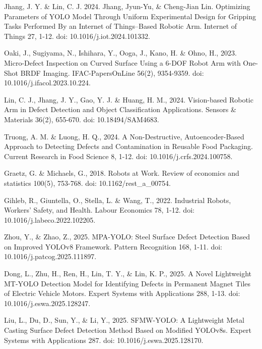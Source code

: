 
\begin{thebibliography}{9}

  Jhang, J. Y. \& Lin, C. J. 2024. Jhang, Jyun-Yu, \& Cheng-Jian
  Lin. Optimizing Parameters of YOLO Model Through Uniform
  Experimental Design for Gripping Tasks Performed By an Internet of
  Things–Based Robotic Arm. Internet of Things 27, 1-12. doi:
  10.1016/j.iot.2024.101332.

  Oaki, J., Sugiyama, N., Ishihara, Y., Ooga, J., Kano, H. \& Ohno,
  H., 2023. Micro-Defect Inspection on Curved Surface Using a 6-DOF
  Robot Arm with One-Shot BRDF Imaging. IFAC-PapersOnLine 56(2),
  9354-9359. doi: 10.1016/j.ifacol.2023.10.224.

  Lin, C. J., Jhang, J. Y., Gao, Y. J. \& Huang, H. M., 2024.
  Vision-based Robotic Arm in Defect Detection and Object
  Classification Applications. Sensors \& Materials 36(2), 655-670.
  doi: 10.18494/SAM4683.

  Truong, A. M. \& Luong, H. Q., 2024. A Non-Destructive,
  Autoencoder-Based Approach to Detecting Defects and Contamination
  in Reusable Food Packaging. Current Research in Food Science 8, 1-12.
  doi: 10.1016/j.crfs.2024.100758.

  Graetz, G. \& Michaels, G., 2018. Robots at Work. Review of
  economics and statistics 100(5), 753-768. doi: 10.1162/rest\_a\_00754.

  Gihleb, R., Giuntella, O., Stella, L. \& Wang, T., 2022.
  Industrial Robots, Workers’ Safety, and Health. Labour Economics
  78, 1-12. doi: 10.1016/j.labeco.2022.102205.

  Zhou, Y., \& Zhao, Z., 2025. MPA-YOLO: Steel Surface Defect
  Detection Based on Improved YOLOv8 Framework. Pattern Recognition
  168, 1-11. doi: 10.1016/j.patcog.2025.111897.

  Dong, L., Zhu, H., Ren, H., Lin, T. Y., \& Lin, K. P., 2025. A
  Novel Lightweight MT-YOLO Detection Model for Identifying Defects
  in Permanent Magnet Tiles of Electric Vehicle Motors. Expert
  Systems with Applications 288, 1-13. doi: 10.1016/j.eswa.2025.128247.

  Liu, L., Du, D., Sun, Y., \& Li, Y., 2025. SFMW-YOLO: A Lightweight
  Metal Casting Surface Defect Detection Method Based on Modified
  YOLOv8s. Expert Systems with Applications 287. doi:
  10.1016/j.eswa.2025.128170.


\end{thebibliography}

